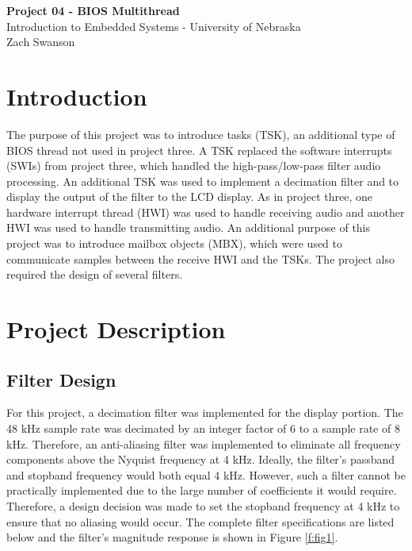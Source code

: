\documentclass[11pt,pdftex,portrait,letterpaper]{article}
\begin{document}
\vspace*{30ex}
\begin{center}

\textbf{Project 04 - BIOS Multithread }\\

\vspace{4ex}
Introduction to Embedded Systems - University of Nebraska \\

\vspace{4ex}
Zach Swanson\\

\end{center}


\pagebreak
\tableofcontents
\pagebreak


\section{Introduction}

The purpose of this project was to introduce tasks (TSK), an additional type of BIOS thread not used in project three. A TSK replaced the software interrupts (SWIs) from project three, which handled the high-pass/low-pass filter audio processing. An additional TSK was used to implement a decimation filter and to display the output of the filter to the LCD display. As in project three, one hardware interrupt thread (HWI) was used to handle receiving audio and another HWI was used to handle transmitting audio. An additional purpose of this project was to introduce mailbox objects (MBX), which were used to communicate samples between the receive HWI and the TSKs. The project also required the design of several filters. 
 
\section{Project Description}

\subsection{Filter Design}

For this project, a decimation filter was implemented for the display portion. The 48 kHz sample rate was decimated by an integer factor of 6 to a sample rate of 8 kHz. Therefore, an anti-aliasing filter was implemented to eliminate all frequency components above the Nyquist frequency at 4 kHz. Ideally, the filter's passband and stopband frequency would both equal 4 kHz. However, such a filter cannot be practically implemented due to the large number of coefficients it would require. Therefore, a design decision was made to set the stopband frequency at 4 kHz to ensure that no aliasing would occur. The complete filter specifications are listed below and the filter's magnitude response is shown in Figure \ref{f:fig1}. 
\end{document}
